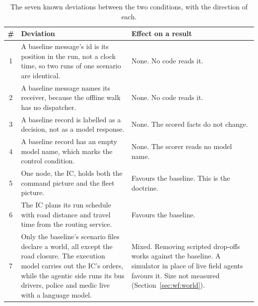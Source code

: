 \begin{table}[htbp]
\centering
\caption[The seven parity deviations]{The seven known deviations between the
two conditions, with the direction of each.}
\label{tab:eval:deviations}
\small
\begin{tabularx}{\textwidth}{c>{\raggedright\arraybackslash}X>{\raggedright\arraybackslash}p{3.6cm}}
\toprule
\# & Deviation & Effect on a result \\
\midrule
1 & A baseline message's id is its position in the run, not a clock time, so two runs of one scenario are identical. & None. No code reads it. \\
2 & A baseline message names its receiver, because the offline walk has no dispatcher. & None. No code reads it. \\
3 & A baseline record is labelled as a decision, not as a model response. & None. The scored facts do not change. \\
4 & A baseline record has an empty model name, which marks the control condition. & None. The scorer reads no model name. \\
5 & One node, the IC, holds both the command picture and the fleet picture. & Favours the baseline. This is the doctrine. \\
6 & The IC plans its run schedule with road distance and travel time from the routing service. & Favours the baseline. \\
7 & Only the baseline's scenario files declare a world, all except the road closure. The execution model carries out the IC's orders, while the agentic side runs its bus drivers, police and medic live with a language model. & Mixed. Removing scripted drop-offs works against the baseline. A simulator in place of live field agents favours it. Size not measured (Section~\ref{sec:wf:world}). \\
\bottomrule
\end{tabularx}
\end{table}

